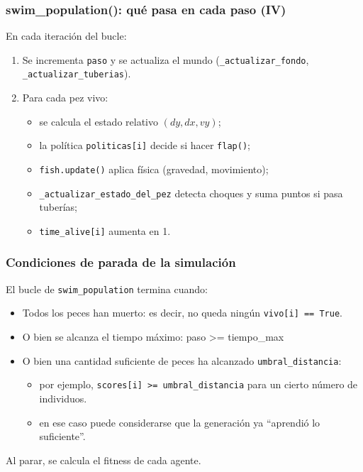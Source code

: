 \documentclass[
	11pt, %
]{beamer}
\begin{document}
\begin{frame}
\frametitle{swim\_population(): qué pasa en cada paso (IV)}

En cada iteración del bucle:

\vspace{6pt}

\begin{enumerate}
    \item Se incrementa \texttt{paso} y se actualiza el mundo
          (\texttt{\_actualizar\_fondo}, \texttt{\_actualizar\_tuberias}).
    \vspace{3pt}
    \item Para cada pez vivo:
    \begin{itemize}
        \item se calcula el estado relativo \((dy, dx, vy)\);
        \item la política \texttt{politicas[i]} decide si hacer \texttt{flap()};
        \item \texttt{fish.update()} aplica física (gravedad, movimiento);
        \item \texttt{\_actualizar\_estado\_del\_pez} detecta choques
              y suma puntos si pasa tuberías;
        \item \texttt{time\_alive[i]} aumenta en 1.
    \end{itemize}
\end{enumerate}

\end{frame}


\begin{frame}
\frametitle{Condiciones de parada de la simulación}

El bucle de \texttt{swim\_population} termina cuando:

\vspace{6pt}

\begin{itemize}
    \item Todos los peces han muerto:
        es decir, no queda ningún \texttt{vivo[i] == True}.
    \item O bien se alcanza el tiempo máximo:
        paso >= tiempo\_max
    \item O bien una cantidad suficiente de peces ha alcanzado
          \texttt{umbral\_distancia}:
    \begin{itemize}
        \item por ejemplo, \texttt{scores[i] >= umbral\_distancia}
              para un cierto número de individuos.
        \item en ese caso puede considerarse que la generación ya “aprendió lo suficiente”.
    \end{itemize}
\vspace{6pt}
\end{itemize}

Al parar, se calcula el fitness de cada agente.

\end{frame}
\end{document}

